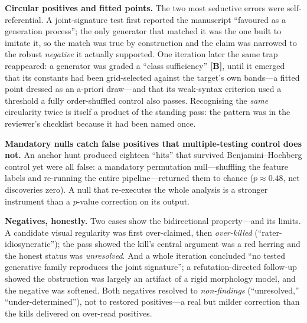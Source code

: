 \documentclass[11pt]{article}
\begin{document}
\textbf{Circular positives and fitted points.} The two most seductive errors were
self-referential. A joint-signature test first reported the manuscript ``favoured as a
generation process''; the only generator that matched it was the one built to imitate it, so
the match was true by construction and the claim was narrowed to the robust \emph{negative}
it actually supported. One iteration later the same trap reappeared: a generator was graded a
``class sufficiency'' \textbf{[B]}, until it emerged that its constants had been grid-selected
against the target's own bands---a fitted point dressed as an a-priori draw---and that its
weak-syntax criterion used a threshold a fully order-shuffled control also passes. Recognising
the \emph{same} circularity twice is itself a product of the standing pass: the pattern was in
the reviewer's checklist because it had been named once.

\textbf{Mandatory nulls catch false positives that multiple-testing control does not.} An
anchor hunt produced eighteen ``hits'' that survived Benjamini--Hochberg control yet were all
false: a mandatory permutation null---shuffling the feature labels and re-running the entire
pipeline---returned them to chance ($p\approx0.48$, net discoveries zero). A null that
re-executes the whole analysis is a stronger instrument than a $p$-value correction on its
output.

\textbf{Negatives, honestly.} Two cases show the bidirectional property---and its limits. A
candidate visual regularity was first over-claimed, then \emph{over-killed}
(``rater-idiosyncratic''); the pass showed the kill's central argument was a red herring and
the honest status was \emph{unresolved}. And a whole iteration concluded ``no tested
generative family reproduces the joint signature''; a refutation-directed follow-up showed the
obstruction was largely an artifact of a rigid morphology model, and the negative was
softened. Both negatives resolved to \emph{non-findings} (``unresolved,''
``under-determined''), not to restored positives---a real but milder correction than the kills
delivered on over-read positives.
\end{document}
